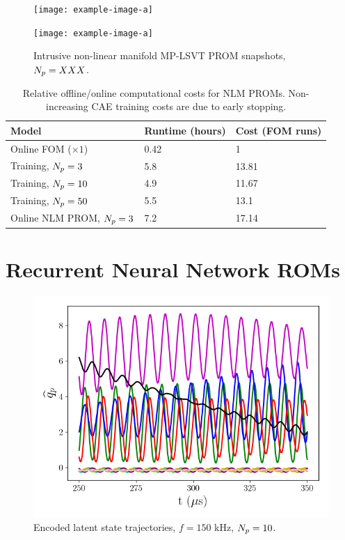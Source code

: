 \begin{figure}
    \begin{minipage}{0.49\linewidth}
        \texttt{[image: example-image-a]}
    \end{minipage}
    \begin{minipage}{0.49\linewidth}
        \texttt{[image: example-image-a]}
    \end{minipage}
    \caption{Intrusive non-linear manifold MP-LSVT PROM snapshots, $N_p = XXX$.}
\end{figure}

\begin{table}
	\centering
	\begin{tabular}{ lll }
	\toprule
	Model & Runtime (hours) & Cost (FOM runs)  \\
	\midrule
    Online FOM ($\times 1$) & 0.42 & 1 \\
    Training, $N_p = 3$ & 5.8 & 13.81 \\
    Training, $N_p = 10$ & 4.9 & 11.67 \\
    Training, $N_p = 50$ & 5.5 & 13.1 \\
    Online NLM PROM, $N_p = 3$ & 7.2 & 17.14 \\
	\bottomrule
	\end{tabular}
	\caption{\label{tab:caeCost}Relative offline/online computational costs for NLM PROMs. Non-increasing CAE training costs are due to early stopping.}
\end{table}

\section{Recurrent Neural Network ROMs}

\begin{figure}
    \centering
    \includegraphics[width=0.6\linewidth]{Chapters/TransientFlame/Images/nonlinear/latent_vars.png}
    \caption{Encoded latent state trajectories, $f = 150$ kHz, $N_p = 10$.}
\end{figure}

